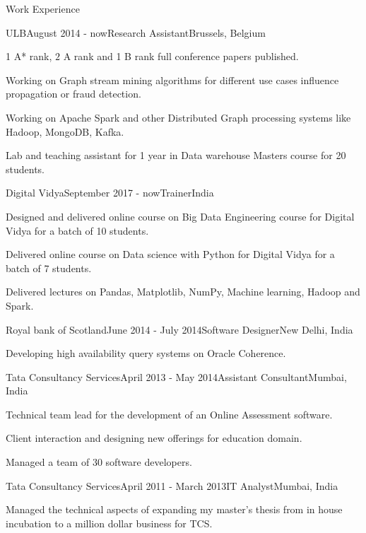 \documentclass{resume} %
\begin{document}
\begin{rSection}{Work Experience}
\begin{rSubsection}{ULB}{August 2014 - now}{Research Assistant}{Brussels, Belgium}
\item 1 A* rank, $2$ A rank and 1 B rank full conference papers published.
\item Working on Graph stream mining algorithms for different use cases influence propagation or fraud detection.
\item Working on Apache Spark and other Distributed Graph processing systems like Hadoop, MongoDB, Kafka.
\item Lab and teaching assistant for 1 year in Data warehouse Masters course for 20 students.
\end{rSubsection}
\begin{rSubsection}{Digital Vidya}{September 2017 - now}{Trainer}{India}
\item Designed and delivered online course on Big Data Engineering course for Digital Vidya for a batch of 10 students.
\item Delivered online course on Data science with Python for Digital Vidya for a batch of 7 students.
\item Delivered lectures on Pandas, Matplotlib, NumPy, Machine learning, Hadoop and Spark.
\end{rSubsection}
\begin{rSubsection}{Royal bank of Scotland}{June 2014 - July 2014}{Software Designer}{New Delhi, India}
\item Developing high availability query systems on Oracle Coherence.
\end{rSubsection}
\begin{rSubsection}{Tata Consultancy Services}{April 2013 - May 2014}{Assistant Consultant}{Mumbai, India}
\item Technical team lead for the development of an Online Assessment software. 
\item Client interaction and designing new offerings for education domain.
\item Managed a team of $30$ software developers.  
\end{rSubsection}
\begin{rSubsection}{Tata Consultancy Services}{April 2011 - March 2013}{IT Analyst}{Mumbai, India}
\item Managed the technical aspects of expanding my master's thesis from in house incubation to a million dollar business for TCS.

\end{rSubsection}
\end{rSection}
\end{document}
